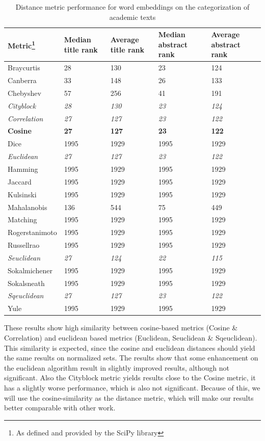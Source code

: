 \documentclass[../../Thesis.tex]{subfiles}
\begin{document}
\begin{table}[hbt]
\begin{tabular}{|l|l|l|l|l|}
\hline
Metric\footnote{As defined and provided by the SciPy library} & Median title rank & Average title rank & Median abstract rank & Average abstract rank  \\
\hline
Braycurtis & 28 & 130 & 23 & 124  \\
\hline
Canberra & 33 & 148 & 26 & 133  \\
\hline
Chebyshev & 57 & 256 & 41 & 191  \\
\hline
\textit{Cityblock} & \textit{28} & \textit{130} & \textit{23} & \textit{124}  \\
\hline
\textit{Correlation} & \textit{27} & \textit{127} & \textit{23} & \textit{122}  \\
\hline
\textbf{Cosine} & \textbf{27} & \textbf{127} & \textbf{23} & \textbf{122}  \\
\hline
Dice & 1995 & 1929 & 1995 & 1929  \\
\hline
\textit{Euclidean} & \textit{27} & \textit{127} & \textit{23} & \textit{122}  \\
\hline
Hamming & 1995 & 1929 & 1995 & 1929  \\
\hline
Jaccard & 1995 & 1929 & 1995 & 1929  \\
\hline
Kulsinski & 1995 & 1929 & 1995 & 1929  \\
\hline
Mahalanobis & 136 & 544 & 75 & 449  \\
\hline
Matching & 1995 & 1929 & 1995 & 1929  \\
\hline
Rogerstanimoto & 1995 & 1929 & 1995 & 1929  \\
\hline
Russellrao & 1995 & 1929 & 1995 & 1929  \\
\hline
\textit{Seuclidean} & \textit{27} & \textit{124} & \textit{22} & \textit{115}  \\
\hline
Sokalmichener & 1995 & 1929 & 1995 & 1929  \\
\hline
Sokalsneath & 1995 & 1929 & 1995 & 1929  \\
\hline
\textit{Sqeuclidean} & \textit{27} & \textit{127} & \textit{23} & \textit{122}  \\
\hline
Yule & 1995 & 1929 & 1995 & 1929  \\
\hline
\end{tabular}
\caption{Distance metric performance for word embeddings on the categorization of academic texts}\label{table:distanceMetrics}
\end{table}
These results show high similarity between cosine-based metrics (Cosine \& Correlation) and euclidean based metrics (Euclidean, Seuclidean \& Sqeuclidean). This similarity is expected, since the cosine and euclidean distances should yield the same results on normalized sets. The results show that some enhancement on the euclidean algorithm result in slightly improved results, although not significant. Also the Cityblock metric yields results close to the Cosine metric, it has a slightly worse performance, which is also not significant. Because of this, we will use the cosine-similarity as the distance metric, which will make our results better comparable with other work.
\end{document}
